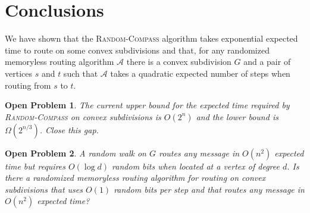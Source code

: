 \documentclass{elsarticle}
\newtheorem{op}{Open Problem}
\begin{document}
\section{Conclusions}

We have shown that the \textsc{Random-Compass} algorithm takes exponential
expected time to route on some convex subdivisions and that, for any randomized
memoryless routing algorithm $\mathcal{A}$ there is a convex subdivision $G$ and a pair of vertices $s$ and $t$ such that 
$\mathcal{A}$ takes a quadratic expected number of steps when routing from $s$ to $t$.

\begin{op}
The current upper bound for the expected time required by \textsc{Random-Compass} on convex subdivisions is $O(2^n)$ and the lower bound is $\Omega(2^{n/3})$.  Close this gap.
\end{op}

\begin{op}
A random walk on $G$ routes any message in $O(n^2)$ expected time but requires $O(\log d)$ random bits when located at a vertex of degree $d$.  Is there a randomized memoryless routing algorithm for routing on convex subdivisions that uses $O(1)$ random bits per step and that routes any message in $O(n^2)$ expected time?
\end{op}








\end{document}
